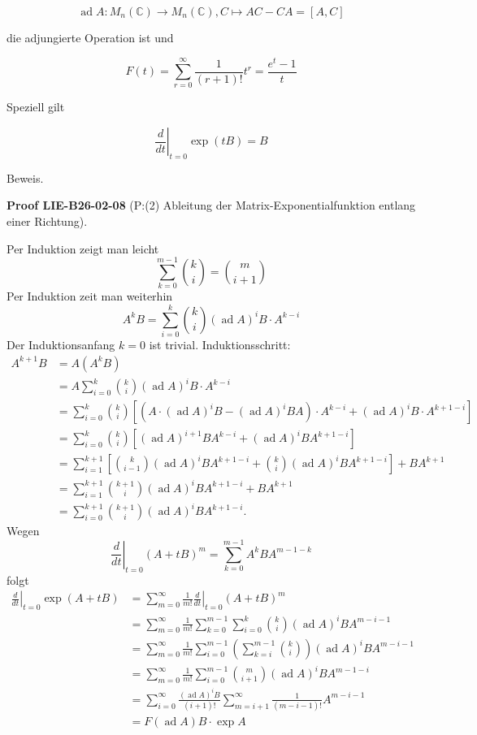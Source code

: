 \documentclass[10pt, letterpaper]{article}
\newcommand{\CustomHeading}[3]{%
  \par\medskip\noindent%
  \textbf{#1 #2} \textnormal{(#3)}.\enskip%
}
\newenvironment{PROOF}[2]{\begin{unitbox}\CustomHeading{Proof}{#1}{#2}}{\end{unitbox}}
\begin{document}
$$
\operatorname{ad} A: M_{n}(\mathbb{C}) \rightarrow M_{n}(\mathbb{C}), C \mapsto A C-C A=[A, C]
$$

die adjungierte Operation ist und

$$
F(t)=\sum_{r=0}^{\infty} \frac{1}{(r+1)!} t^{r}=\frac{e^{t}-1}{t}
$$

Speziell gilt

$$
\left.\frac{d}{d t}\right|_{t=0} \exp (t B)=B
$$

Beweis. 

\begin{PROOF}{LIE-B26-02-08}{P:(2) Ableitung der Matrix-Exponentialfunktion entlang einer Richtung}
Per Induktion zeigt man leicht
$$
\sum_{k=0}^{m-1}\binom{k}{i}=\binom{m}{i+1}
$$
Per Induktion zeit man weiterhin
$$
A^{k} B=\sum_{i=0}^{k}\binom{k}{i}(\operatorname{ad} A)^{i} B \cdot A^{k-i}
$$
Der Induktionsanfang $k=0$ ist trivial. Induktionsschritt:
$$
\begin{aligned}
A^{k+1} B & =A\left(A^{k} B\right) \\
& =A \sum_{i=0}^{k}\binom{k}{i}(\operatorname{ad} A)^{i} B \cdot A^{k-i} \\
& =\sum_{i=0}^{k}\binom{k}{i}\left[\left(A \cdot(\operatorname{ad} A)^{i} B-(\operatorname{ad} A)^{i} B A\right) \cdot A^{k-i}+(\operatorname{ad} A)^{i} B \cdot A^{k+1-i}\right] \\
& =\sum_{i=0}^{k}\binom{k}{i}\left[(\operatorname{ad} A)^{i+1} B A^{k-i}+(\operatorname{ad} A)^{i} B A^{k+1-i}\right] \\
& =\sum_{i=1}^{k+1}\left[\binom{k}{i-1}(\operatorname{ad} A)^{i} B A^{k+1-i}+\binom{k}{i}(\operatorname{ad} A)^{i} B A^{k+1-i}\right]+B A^{k+1} \\
& =\sum_{i=1}^{k+1}\binom{k+1}{i}(\operatorname{ad} A)^{i} B A^{k+1-i}+B A^{k+1} \\
& =\sum_{i=0}^{k+1}\binom{k+1}{i}(\operatorname{ad} A)^{i} B A^{k+1-i} .
\end{aligned}
$$
Wegen
$$
\left.\frac{d}{d t}\right|_{t=0}(A+t B)^{m}=\sum_{k=0}^{m-1} A^{k} B A^{m-1-k}
$$
folgt
$$
\begin{aligned}
\left.\frac{d}{d t}\right|_{t=0} \exp (A+t B) & =\left.\sum_{m=0}^{\infty} \frac{1}{m!} \frac{d}{d t}\right|_{t=0}(A+t B)^{m} \\
& =\sum_{m=0}^{\infty} \frac{1}{m!} \sum_{k=0}^{m-1} \sum_{i=0}^{k}\binom{k}{i}(\operatorname{ad} A)^{i} B A^{m-i-1} \\
& =\sum_{m=0}^{\infty} \frac{1}{m!} \sum_{i=0}^{m-1}\left(\sum_{k=i}^{m-1}\binom{k}{i}\right)(\operatorname{ad} A)^{i} B A^{m-i-1} \\
& =\sum_{m=0}^{\infty} \frac{1}{m!} \sum_{i=0}^{m-1}\binom{m}{i+1}(\operatorname{ad} A)^{i} B A^{m-1-i} \\
& =\sum_{i=0}^{\infty} \frac{(\operatorname{ad} A)^{i} B}{(i+1)!} \sum_{m=i+1}^{\infty} \frac{1}{(m-i-1)!} A^{m-i-1} \\
& =F(\operatorname{ad} A) B \cdot \exp A
\end{aligned}
$$
\end{PROOF}
\end{document}
